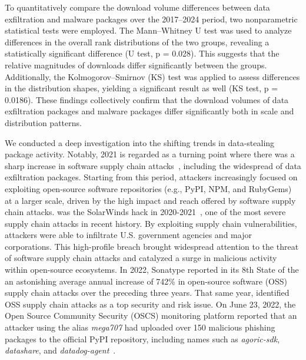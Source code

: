  

To quantitatively compare the download volume differences between data exfiltration and malware packages over the 2017–2024 period, two nonparametric statistical tests were employed. The Mann–Whitney U test was used to analyze differences in the overall rank distributions of the two groups, revealing a statistically significant difference (U test, p = 0.028). This suggests that the relative magnitudes of downloads differ significantly between the groups. Additionally, the Kolmogorov–Smirnov (KS) test was applied to assess differences in the distribution shapes, yielding a significant result as well (KS test, p = 0.0186). These findings collectively confirm that the download volumes of data exfiltration packages and malware packages differ significantly both in scale and distribution patterns.

We conducted a deep investigation into the shifting trends in data-stealing package activity. Notably, 2021 is regarded as a turning point where there was a sharp increase in software supply chain attacks~\cite{Kaspersky2024}, including the widespread of data exfiltration packages. Starting from this period, attackers increasingly focused on exploiting open-source software repositories (e.g., PyPI, NPM, and RubyGems) at a larger scale, driven by the high impact and reach offered by software supply chain attacks. was the SolarWinds hack in 2020-2021~\cite{SolarWinds-SecurityAdvisory}, one of the most severe supply chain attacks in recent history. By exploiting supply chain vulnerabilities, attackers were able to infiltrate U.S. government agencies and major corporations. This high-profile breach brought widespread attention to the threat of software supply chain attacks and catalyzed a surge in malicious activity within open-source ecosystems. In 2022, Sonatype reported in its 8th State of the  an astonishing average annual increase of 742\% in open-source software (OSS) supply chain attacks over the preceding three years. That same year,  identified OSS supply chain attacks as a top security and risk issue. On June 23, 2022, the Open Source Community Security (OSCS) monitoring platform reported that an attacker using the alias \textit{mega707} had uploaded over 150 malicious phishing packages to the official PyPI repository, including names such as \textit{agoric-sdk}, \textit{datashare}, and \textit{datadog-agent}~\cite{OSCS-MPS-2022-20159}.

